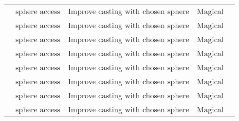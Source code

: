 \begin{longtabuwrapper}
\begin{longtabu}{>{\lcol}p{11em} >{\lcol}p{15em} >{\lcol}X >{\lcol}p{8em} >{\lcol}p{3em}}
               &  sphere access       & Improve casting with chosen sphere           & Magical &        \\
                   &  sphere access           & Improve casting with chosen sphere           & Magical &            \\
              &  sphere access      & Improve casting with chosen sphere           & Magical &       \\
               &  sphere access       & Improve casting with chosen sphere           & Magical &        \\
              &  sphere access      & Improve casting with chosen sphere           & Magical &       \\
               &  sphere access       & Improve casting with chosen sphere           & Magical &        \\
              &  sphere access      & Improve casting with chosen sphere           & Magical &       \\
              &  sphere access      & Improve casting with chosen sphere           & Magical &       \\


\end{longtabu}
\end{longtabuwrapper}
